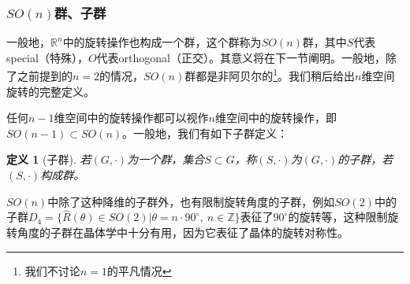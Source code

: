 \documentclass[a4paper,11pt]{ctexart}
\newcommand{\reals}{\mathbb{R}}
\newcommand{\ints}{\mathbb{Z}}
\newtheorem{dfn}{定义}[section]
\begin{document}
\subsubsection{$SO(n)$群、子群}
一般地，$\reals^n$中的旋转操作也构成一个群，这个群称为$SO(n)$群，其中$S$代表special（特殊），$O$代表orthogonal（正交）。其意义将在下一节阐明。一般地，除了之前提到的$n=2$的情况，$SO(n)$群都是非阿贝尔的\footnote{我们不讨论$n=1$的平凡情况}。我们稍后给出$n$维空间旋转的完整定义。\par
任何$n-1$维空间中的旋转操作都可以视作$n$维空间中的旋转操作，即$SO(n-1) \subset SO(n)$。一般地，我们有如下子群定义：
\begin{dfn}[子群]
若$(G,\cdot)$为一个群，集合$S \subset G$，称$(S,\cdot)$为$(G,\cdot)$的子群，若$(S,\cdot)$构成群。
\end{dfn}
$SO(n)$中除了这种降维的子群外，也有限制旋转角度的子群，例如$SO(2)$中的子群$D_4 = \{ \hat{R}(\theta) \in SO(2) | \theta = n\cdot 90^\circ,\ n \in \ints \}$表征了$90^\circ$的旋转等，这种限制旋转角度的子群在晶体学中十分有用，因为它表征了晶体的旋转对称性。 
\end{document}
